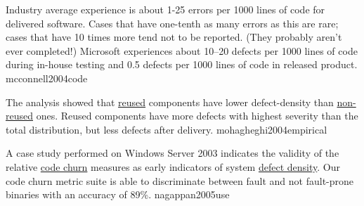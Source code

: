\documentclass{article}
\begin{document}

  {Industry average experience is about 1-25 errors per 1000 lines of code for delivered software. Cases that have one-tenth as many errors as this are rare; cases that have 10 times more tend not to be reported. (They probably aren't ever completed!) Microsoft experiences about 10–20 defects per 1000 lines of code during in-house testing and 0.5 defects per 1000 lines of code in released product.}
  {mcconnell2004code}


  {The analysis showed that \ul{reused} components have lower defect-density than \ul{non-reused} ones. Reused components have more defects with highest severity than the total distribution, but less defects after delivery.}
  {mohagheghi2004empirical}

  {A case study performed on Windows Server 2003 indicates the validity of the relative \ul{code churn} measures as early indicators of system \ul{defect density}. Our code churn metric suite is able to discriminate between fault and not fault-prone binaries with an accuracy of 89\%.}
  {nagappan2005use}
\end{document}

